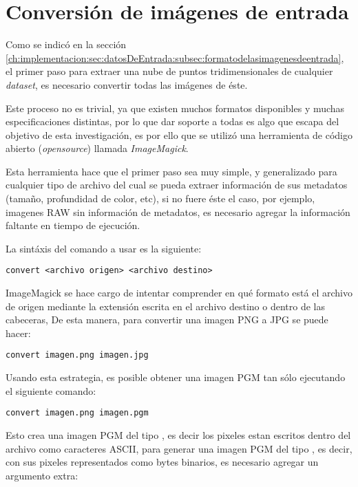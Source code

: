 \section{Conversión de imágenes de entrada}
\label{ch:implementacion:sec:conversiondeimagenesdeentrada}

Como se indicó en la sección \ref{ch:implementacion:sec:datosDeEntrada:subsec:formatodelasimagenesdeentrada}, el primer paso para extraer una nube de puntos tridimensionales de cualquier \emph{dataset}, es necesario convertir todas las imágenes de éste.

Este proceso no es trivial, ya que existen muchos formatos disponibles y muchas especificaciones distintas, por lo que dar soporte a todas es algo que escapa del objetivo de esta investigación, es por ello que se utilizó una herramienta de código abierto (\emph{opensource}) llamada \emph{ImageMagick}.

Esta herramienta hace que el primer paso sea muy simple, y generalizado para cualquier tipo de archivo del cual se pueda extraer información de sus metadatos (tamaño, profundidad de color, etc), si no fuere éste el caso, por ejemplo, imagenes RAW sin información de metadatos, es necesario agregar la información faltante en tiempo de ejecución.

La sintáxis del comando a usar es la siguiente:

\begin{verbatim}
convert <archivo origen> <archivo destino>
\end{verbatim}

ImageMagick se hace cargo de intentar comprender en qué formato está el archivo de origen mediante la extensión escrita en el archivo destino o dentro de las cabeceras, De esta manera, para convertir una imagen PNG a JPG se puede hacer:

\begin{verbatim}
convert imagen.png imagen.jpg
\end{verbatim}

Usando esta estrategia, es posible obtener una imagen PGM tan sólo ejecutando el siguiente comando:

\begin{verbatim}
convert imagen.png imagen.pgm
\end{verbatim}

Esto crea una imagen PGM del tipo , es decir los pixeles estan escritos dentro del archivo como caracteres ASCII, para generar una imagen PGM del tipo , es decir, con sus pixeles representados como bytes binarios, es necesario agregar un argumento extra:

